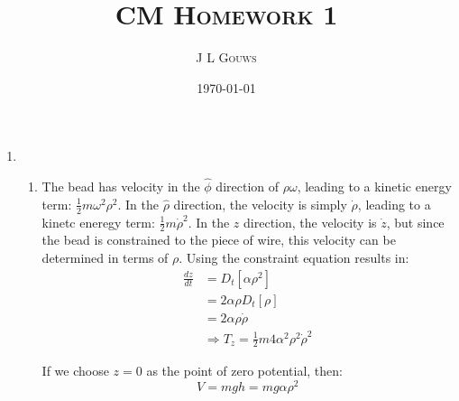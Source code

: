 \documentclass[12pt,a4]{article}
\title{
\textsc{CM Homework 1}
}
\author{\textsc{J L Gouws}
}
\date{\today
\\[1cm]}
\begin{document}
\thispagestyle{empty}

\maketitle

\begin{enumerate}
  \item
    \begin{enumerate}
      \item 
        The bead has velocity in the $\hat\phi$ direction of $\rho\omega$, leading to a kinetic energy term: $\frac{1}{2} m \omega^2 \rho^2$.
        In the $\hat\rho$ direction, the velocity is simply $\dot\rho$, leading to a kinetc eneregy term: $\frac{1}{2} m \dot\rho^2$.
        In the $z$ direction, the velocity is $\dot z$, but since the bead is constrained to the piece of wire, this velocity can be determined in terms of $\rho$.
        Using the constraint equation results in:
        \begin{align*}
          \frac{dz}{dt} &= D_t\left[\alpha \rho^2 \right]\\
                        &= 2 \alpha \rho D_t\left[\rho \right]\\
                        &= 2 \alpha \rho \dot\rho \\
                        &\Rightarrow T_z = \frac{1}{2} m 4 \alpha^2 \rho^2 \dot \rho^2
        \end{align*}

        If we choose $z=0$ as the point of zero potential, then:
        \begin{equation*}
          V = m g h = m g \alpha \rho^2
        \end{equation*}


\end{enumerate}
\end{enumerate}
\end{document}
